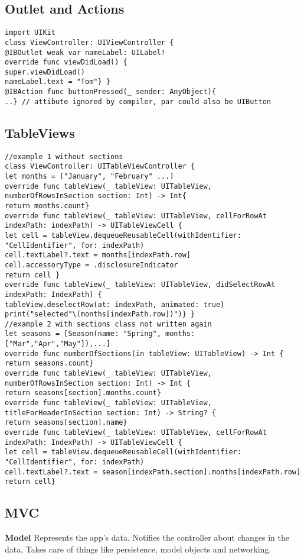 \subsection{Outlet and Actions}
\begin{lstlisting}
import UIKit
class ViewController: UIViewController {
@IBOutlet weak var nameLabel: UILabel!
override func viewDidLoad() {
super.viewDidLoad()
nameLabel.text = "Tom"} }
@IBAction func buttonPressed(_ sender: AnyObject){
..} // attibute ignored by compiler, par could also be UIButton
\end{lstlisting}

\subsection{TableViews}
\begin{lstlisting}
//example 1 without sections
class ViewController: UITableViewController {
let months = ["January", "February" ...]
override func tableView(_ tableView: UITableView, numberOfRowsInSection section: Int) -> Int{
return months.count}
override func tableView(_ tableView: UITableView, cellForRowAt indexPath: indexPath) -> UITableViewCell {
let cell = tableView.dequeueReusableCell(withIdentifier: "CellIdentifier", for: indexPath)
cell.textLabel?.text = months[indexPath.row]
cell.accessoryType = .disclosureIndicator
return cell }
override func tableView(_ tableView: UITableView, didSelectRowAt indexPath: IndexPath) {
tableView.deselectRow(at: indexPath, animated: true)
print("selected"\(months[indexPath.row])")} }
//example 2 with sections class not written again
let seasons = [Season(name: "Spring", months: ["Mar","Apr","May"]),...]
override func numberOfSections(in tableView: UITableView) -> Int { return seasons.count}
override func tableView(_ tableView: UITableView, numberOfRowsInSection section: Int) -> Int {
return seasons[section].months.count}
override func tableView(_ tableView: UITableView, titleForHeaderInSection section: Int) -> String? {
return seasons[section].name}
override func tableView(_ tableView: UITableView, cellForRowAt indexPath: IndexPath) -> UITableViewCell {
let cell = tableView.dequeueReusableCell(withIdentifier: "CellIdentifier", for: indexPath)
cell.textLabel?.text = season[indexPath.section].months[indexPath.row]
return cell}
\end{lstlisting}

\subsection{MVC}
\textbf{Model}
Represents the app's data,
Notifies the controller about changes in the data,
Takes care of things like persistence, model objects and networking.

